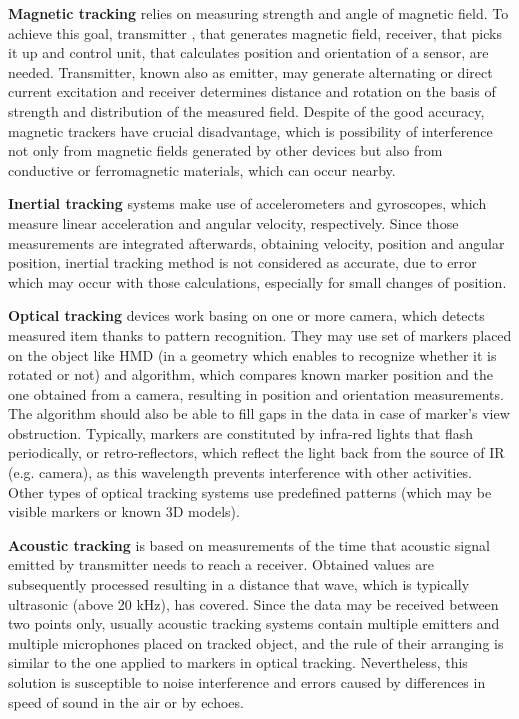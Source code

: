 \textbf{Magnetic tracking} relies on measuring strength and angle of magnetic field. To achieve this goal, transmitter , that generates magnetic field, receiver, that picks it up and control unit, that calculates position and orientation of a sensor, are needed. Transmitter, known also as emitter, may generate alternating or direct current excitation and receiver determines distance and rotation on the basis of strength and distribution of the measured field. Despite of the good accuracy, magnetic trackers have crucial disadvantage, which is possibility of interference not only from magnetic fields generated by other devices but also from conductive or ferromagnetic materials, which can occur nearby. 

\textbf{Inertial tracking} systems make use of accelerometers and gyroscopes, which measure linear acceleration and angular velocity, respectively. Since those measurements are integrated afterwards, obtaining velocity, position and angular position, inertial tracking method is not considered as accurate, due to error which may occur with those calculations, especially for small changes of position. 

\textbf{Optical tracking} devices work basing on one or more camera, which detects measured item thanks to pattern recognition.  They may use set of markers placed on the object like HMD (in a geometry which enables to recognize whether it is rotated or not) and algorithm, which compares known marker position and the one obtained from a camera, resulting in position and orientation measurements. The algorithm should also be able to fill gaps in the data in case of marker's view obstruction. Typically, markers are constituted by infra-red lights that flash periodically, or retro-reflectors, which reflect the light back from the source of IR (e.g. camera), as this wavelength prevents interference with other activities. Other types of optical tracking systems use predefined patterns (which may be visible markers or known 3D models).

\textbf{Acoustic tracking} is based on measurements of the time that acoustic signal emitted by transmitter needs to reach a receiver. Obtained values are subsequently processed resulting in a distance that wave, which is typically ultrasonic (above 20 kHz), has covered. Since the data may be received between two points only, usually acoustic tracking systems contain multiple emitters and multiple microphones placed on tracked object, and the rule of their arranging is similar to the one applied to markers in optical tracking. Nevertheless, this solution is susceptible to noise interference and errors caused by differences in speed of sound in the air or by echoes.

